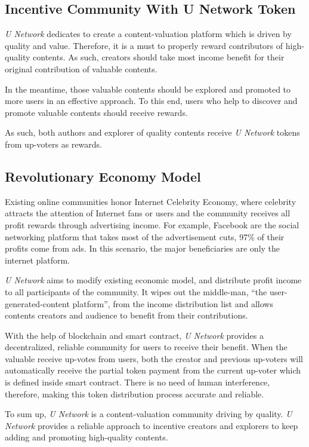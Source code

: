 \subsection{Incentive Community With U Network Token}
\emph{U Network} dedicates to create a content-valuation platform which is driven by quality and value. Therefore, it is a must to properly reward contributors of high-quality contents. As such, creators should take most income benefit for their original contribution of valuable contents.

In the meantime, those valuable contents should be explored and promoted to more users in an effective approach. To this end, users who help to discover and promote valuable contents should receive rewards. 

As such, both authors and explorer of quality contents receive \emph{U Network} tokens from up-voters as rewards. 

\subsection{Revolutionary Economy Model}	
Existing online communities honor Internet Celebrity Economy, where celebrity attracts the attention of Internet fans or users and the community receives all profit rewards through advertising income. For example, Facebook are the social networking platform that takes most of the advertisement cuts, 97\% of their profits come from ads. In this scenario, the major beneficiaries are only the internet platform.

\emph{U Network} aims to modify existing economic model, and distribute profit income to all participants of the community. It wipes out the middle-man, ``the user-generated-content platform'',  from the income distribution list and allows contents creators and audience to benefit from their contributions. 

With the help of blockchain and smart contract, \emph{U Network} provides a decentralized, reliable community for users to receive their benefit. When the valuable receive up-votes from users, both the creator and previous up-voters will automatically receive the partial token payment from the current up-voter which is defined inside smart contract. There is no need of human interference, therefore, making this token distribution process accurate and reliable.  

To sum up, \emph{U Network}  is a content-valuation community driving by quality. \emph{U Network} provides a reliable approach to incentive creators and explorers to keep adding and promoting high-quality contents. 